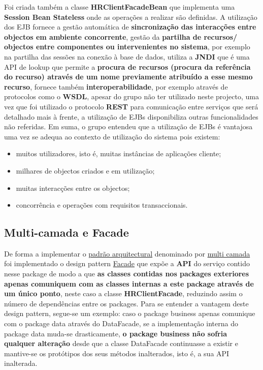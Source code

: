 \hspace{5mm} Foi criada também a classe \textbf{HRClientFacadeBean} que implementa uma \textbf{Session Bean Stateless} onde as operações a realizar são definidas. A utilização dos EJB fornece a gestão automática de \textbf{sincronização das interacções entre objectos em ambiente concorrente}, gestão da \textbf{partilha de recursos/ objectos entre componentes ou intervenientes no sistema}, por exemplo na partilha das sessões na conexão à base de dados, utiliza a \textbf{JNDI} que é uma API de lookup que permite a \textbf{procura de recursos (procura da referência do recurso) através de um nome previamente atribuído a esse mesmo recurso}, fornece também \textbf{interoperabilidade}, por exemplo através de protocolos como o \textbf{WSDL}, apesar do grupo não ter utilizado neste projecto, uma vez que foi utilizado o protocolo \textbf{REST} para comunicação entre serviços que será detalhado mais à frente, a utilização de EJBs disponibiliza outras funcionalidades não referidas. Em suma, o grupo entendeu que a utilização de EJBs é vantajosa uma vez se adequa ao contexto de utilização do sistema pois existem:

\begin{itemize}
    \item muitos utilizadores, isto é, muitas instâncias de aplicações cliente;
    \item milhares de objectos criados e em utilização;
    \item muitas interacções entre os objectos;
    \item concorrência e operações com requisitos transaccionais.
\end{itemize}

\subsection{Multi-camada e Facade}

\hspace{5mm} De forma a implementar o \href{https://en.wikipedia.org/wiki/Architectural_pattern#:~:text=An\%20architectural\%20pattern\%20is\%20a,minimization\%20of\%20a\%20business\%20risk.}{padrão arquitectural} denominado por \href{https://en.wikipedia.org/wiki/Multitier_architecture}{multi camada} foi implementado o design pattern \href{https://refactoring.guru/design-patterns/facade}{Facade} que expõe a \textbf{API} do serviço contido nesse package de modo a que \textbf{as classes contidas nos packages exteriores apenas comuniquem com as classes internas a este package através de um único ponto}, neste caso a classe \textbf{HRClientFacade}, reduzindo assim o número de dependências entre os packages. Para se entender a vantagem deste design pattern, segue-se um exemplo: caso o package business apenas comunique com o package data através do DataFacade, se a implementação interna do package data muda-se drasticamente, \textbf{o package business não sofria qualquer alteração} desde que a classe DataFacade continuasse a existir e mantive-se os protótipos dos seus métodos inalterados, isto é, a sua API inalterada.

